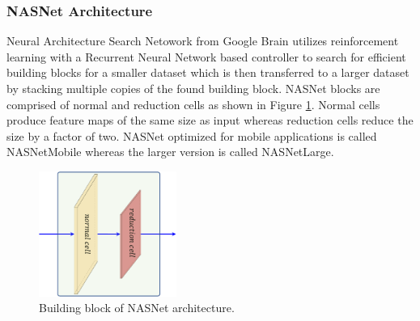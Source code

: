 \subsubsection{NASNet Architecture}
Neural Architecture Search Netowork \cite{NASnetref} from Google Brain utilizes reinforcement learning with a Recurrent Neural Network based controller to search for efficient building blocks for a smaller dataset which is then transferred to a larger dataset by stacking multiple copies of the found building block.  NASNet blocks are comprised of normal and reduction cells as shown in Figure \ref{fig:NASnet}. Normal cells produce feature maps of the same size as input whereas reduction cells reduce the size by a factor of two. NASNet optimized for mobile applications is called NASNetMobile whereas the larger version is called NASNetLarge.
\begin{figure}[htb!]
	\centering
	\includegraphics[width=0.4\textwidth,keepaspectratio]{images/pretraining/NASnet-cropped.pdf}
	\caption[Building block of NASNet architecture]{Building block of NASNet architecture.}
	\label{fig:NASnet}
\end{figure}

